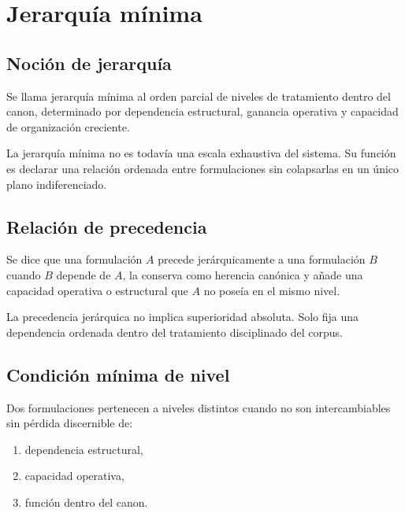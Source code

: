 \chapter{Jerarquía mínima}

\section{Noción de jerarquía}
\begin{definition}
Se llama jerarquía mínima al orden parcial de niveles de tratamiento dentro del canon, determinado por dependencia estructural, ganancia operativa y capacidad de organización creciente.
\end{definition}

\begin{observation}
La jerarquía mínima no es todavía una escala exhaustiva del sistema. Su función es declarar una relación ordenada entre formulaciones sin colapsarlas en un único plano indiferenciado.
\end{observation}

\section{Relación de precedencia}
\begin{definition}
Se dice que una formulación \(A\) precede jerárquicamente a una formulación \(B\) cuando \(B\) depende de \(A\), la conserva como herencia canónica y añade una capacidad operativa o estructural que \(A\) no poseía en el mismo nivel.
\end{definition}

\begin{observation}
La precedencia jerárquica no implica superioridad absoluta. Solo fija una dependencia ordenada dentro del tratamiento disciplinado del corpus.
\end{observation}

\section{Condición mínima de nivel}
\begin{definition}
Dos formulaciones pertenecen a niveles distintos cuando no son intercambiables sin pérdida discernible de:
\begin{enumerate}
  \item dependencia estructural,
  \item capacidad operativa,
  \item función dentro del canon.
\end{enumerate}
\end{definition}

